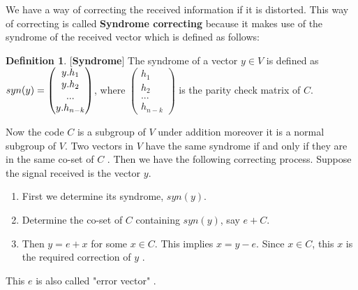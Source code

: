\documentclass[a4paper,twoside,10pt]{article}
\theoremstyle{plain}
\theoremstyle{definition}
\newtheorem{definition}[theorem]{Definition}
\begin{document}
\vspace{2mm}
\noindent
We have a way of correcting the received information if it is distorted. This way of correcting is called \textbf{Syndrome correcting} because it makes use of the syndrome of the received vector which is defined as follows:
\begin{definition} \cite{error_correct} [\textbf{Syndrome}]
  The syndrome of a vector \(y \in V\) is defined as \\ \(syn(y)=\begin{pmatrix} \small
    y.h_1\\
    y.h_2\\
    ...\\
    y.h_{n-k}
  \end{pmatrix}\), \hspace{12mm} where
  \(\begin{pmatrix}
    h_1 \\ h_2\\ ...\\ h_{n-k}
  \end{pmatrix}\) is the parity check matrix of \(C\).
\end{definition}
\noindent
Now the code \(C\) is a subgroup of \(V\) under addition moreover it is a normal subgroup of \(V\). Two vectors in \(V\) have the same syndrome if and only if they are in the same co-set of \(C\) \cite{error_correct}. Then we have the following correcting process. Suppose the signal received is the vector \(y\).
\begin{enumerate}
\item First we determine its syndrome, \(syn(y)\).
\item Determine the co-set of \(C\) containing \(syn(y)\), say \(e + C\).
\item Then \(y=e+x\) for some \(x \in C\). This implies \(x=y-e\). Since \(x \in C\), this \(x\) is the required correction of \(y\) \cite{error_correct}.
\end{enumerate}
This \(e\) is also called "error vector" \cite{error_correct}.
\end{document}
